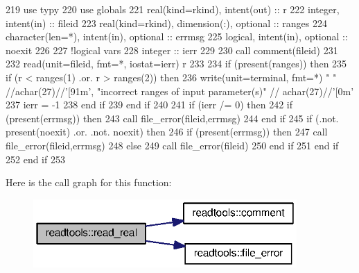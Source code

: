 \begin{DoxyCode}
219       \textcolor{keywordtype}{use }typy
220       \textcolor{keywordtype}{use }globals
221       \textcolor{keywordtype}{real(kind=rkind)}, \textcolor{keywordtype}{intent(out)} :: r
222       \textcolor{keywordtype}{integer}, \textcolor{keywordtype}{intent(in)} :: fileid
223       \textcolor{keywordtype}{real(kind=rkind)}, \textcolor{keywordtype}{dimension(:)}, \textcolor{keywordtype}{optional} :: ranges
224       \textcolor{keywordtype}{character(len=*)}, \textcolor{keywordtype}{intent(in)}, \textcolor{keywordtype}{optional} :: errmsg
225       \textcolor{keywordtype}{logical}, \textcolor{keywordtype}{intent(in)}, \textcolor{keywordtype}{optional} :: noexit
226       
227       \textcolor{comment}{!logical vars}
228       \textcolor{keywordtype}{integer} :: ierr
229       
230       \textcolor{keyword}{call }comment(fileid)
231       
232       \textcolor{keyword}{read}(unit=fileid, fmt=*, iostat=ierr) r
233       
234       \textcolor{keywordflow}{if} (\textcolor{keyword}{present}(ranges)) \textcolor{keywordflow}{then}
235         \textcolor{keywordflow}{if} (r < ranges(1) .or. r > ranges(2)) \textcolor{keywordflow}{then}
236           \textcolor{keyword}{write}(unit=terminal, fmt=*) \textcolor{stringliteral}{" "} //achar(27)//\textcolor{stringliteral}{'[91m'}, \textcolor{stringliteral}{"incorrect ranges of input parameter(s)"}\textcolor{comment}{ //
      achar(27)//}\textcolor{stringliteral}{'[0m'}
237           ierr = -1
238 \textcolor{keywordflow}{        end if}
239 \textcolor{keywordflow}{      end if}
240       
241       \textcolor{keywordflow}{if} (ierr /= 0) \textcolor{keywordflow}{then}
242         \textcolor{keywordflow}{if} (\textcolor{keyword}{present}(errmsg)) \textcolor{keywordflow}{then}
243           \textcolor{keyword}{call }file_error(fileid,errmsg)
244 \textcolor{keywordflow}{        end if}
245         \textcolor{keywordflow}{if} (.not. \textcolor{keyword}{present}(noexit) .or. .not. noexit) \textcolor{keywordflow}{then}
246           \textcolor{keywordflow}{if} (\textcolor{keyword}{present}(errmsg)) \textcolor{keywordflow}{then}
247             \textcolor{keyword}{call }file_error(fileid,errmsg)
248           \textcolor{keywordflow}{else}
249             \textcolor{keyword}{call }file_error(fileid)
250 \textcolor{keywordflow}{          end if}
251 \textcolor{keywordflow}{        end if}
252 \textcolor{keywordflow}{      end if}
253 
\end{DoxyCode}


Here is the call graph for this function\+:\nopagebreak
\begin{figure}[H]
\begin{center}
\leavevmode
\includegraphics[width=285pt]{namespacereadtools_a8cf69cd43a457ddd1b29072139f19772_cgraph}
\end{center}
\end{figure}


